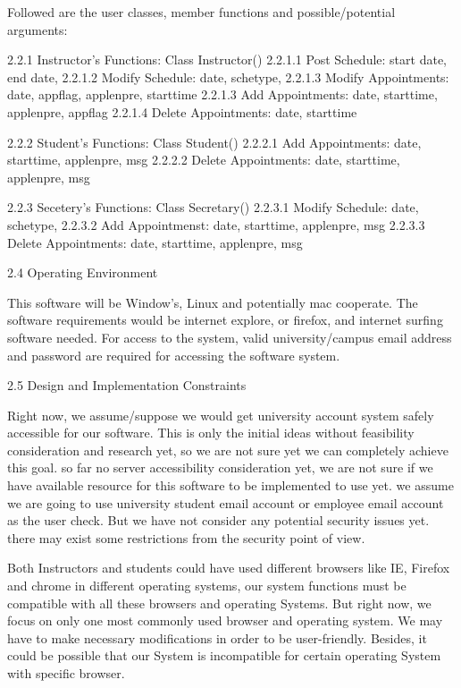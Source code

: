Followed are the user classes, member functions and possible/potential arguments:

2.2.1 Instructor's Functions: Class Instructor(){}
2.2.1.1 Post Schedule:      start date, end date, 
2.2.1.2 Modify Schedule:    date, schetype, 
2.2.1.3 Modify Appointments: date, appflag, applenpre, starttime
2.2.1.3 Add Appointments:   date, starttime, applenpre, appflag
2.2.1.4 Delete Appointments: date, starttime

2.2.2 Student's Functions: Class Student(){}
2.2.2.1 Add Appointments:    date, starttime, applenpre, msg
2.2.2.2 Delete Appointments: date, starttime, applenpre, msg

2.2.3 Secetery's Functions: Class Secretary(){}
2.2.3.1 Modify Schedule:     date, schetype, 
2.2.3.2 Add Appointmenst:    date, starttime, applenpre, msg
2.2.3.3 Delete Appointments: date, starttime, applenpre, msg

2.4 Operating Environment

This software will be Window's, Linux and potentially mac cooperate. 
The software requirements would be internet explore, or firefox, and internet surfing software needed.
For access to the system, valid university/campus email address and password are required for accessing the software system. 

2.5 Design and Implementation Constraints

Right now, we assume/suppose we would get university account system safely accessible for our software. This is only the initial ideas without feasibility consideration and research yet, so we are not sure yet we can completely achieve this goal. 
so far no server accessibility consideration yet, we are not sure if we have available resource for this software to be implemented to use yet. 
we assume we are going to use university student email account or employee email account as the user check. But we have not consider any potential security issues yet. there may exist some restrictions from the security point of view. 

Both Instructors and students could have used different browsers like IE, Firefox and chrome in different operating systems, our system functions must be compatible with all these browsers and operating Systems. But right now, we focus on only one most commonly used browser and operating system. We may have to make necessary modifications in order to be user-friendly. Besides, it could be possible that our System is incompatible for certain operating System with specific browser.


